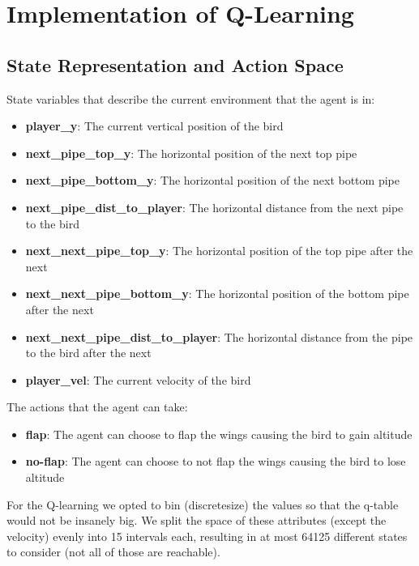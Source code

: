 \documentclass[a4paper,12pt]{article}
\begin{document}
\section{Implementation of Q-Learning}
\subsection{State Representation and Action Space}

\noindent State variables that describe the current environment that the agent is in:
\begin{itemize}
    \item \textbf{player\_y}: The current vertical position of the bird
    \item \textbf{next\_pipe\_top\_y}: The horizontal position of the next top pipe
    \item \textbf{next\_pipe\_bottom\_y}: The horizontal position of the next bottom pipe
    \item \textbf{next\_pipe\_dist\_to\_player}: The horizontal distance from the next pipe to the bird
    \item \textbf{next\_next\_pipe\_top\_y}: The horizontal position of the top pipe after the next
    \item \textbf{next\_next\_pipe\_bottom\_y}: The horizontal position of the bottom pipe after the next
    \item \textbf{next\_next\_pipe\_dist\_to\_player}: The horizontal distance from the pipe to the bird after the next
    \item \textbf{player\_vel}: The current velocity of the bird
\end{itemize}

\noindent The actions that the agent can take:
\begin{itemize}
    \item \textbf{flap}: The agent can choose to flap the wings causing the bird to gain altitude
    \item \textbf{no-flap}: The agent can choose to not flap the wings causing the bird to lose altitude
\end{itemize}

\noindent For the Q-learning we opted to bin (discretesize) the values so that the q-table would not be insanely big. We split the space of these attributes (except the velocity) evenly
into 15 intervals each, resulting in at most 64125 different states to consider (not all of those are reachable).
\end{document}

